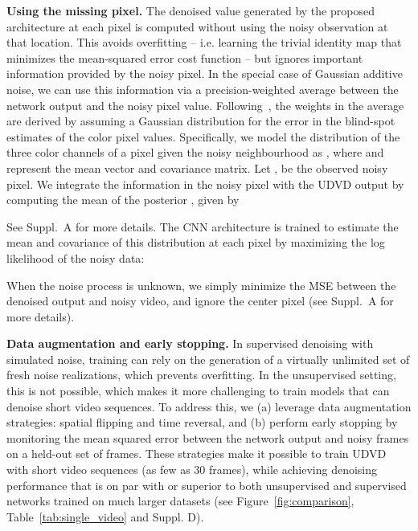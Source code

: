 \documentclass[final]{cvpr}
\begin{document}
\noindent \textbf{Using the missing pixel.} The denoised value generated by the proposed architecture at each pixel is computed without using the noisy observation at that location. This avoids overfitting -- i.e. learning the trivial identity map that minimizes the mean-squared error cost function -- but ignores important information provided by the noisy pixel. In the special case of Gaussian additive noise, we can use this information via a precision-weighted average between the network output and the noisy pixel value. Following~\cite{blindspotnet, pn2v}, the weights in the average are derived by assuming a Gaussian distribution for the error in the blind-spot estimates of the color pixel values. Specifically, we model the distribution of the three color channels of a pixel  given the noisy neighbourhood  as , where  and  represent the mean vector and covariance matrix. Let ,  be the observed noisy pixel. We integrate the information in the noisy pixel with the UDVD output by computing the mean of the posterior , given by 

See Suppl.~A for more details. 
The CNN architecture is trained to estimate the mean and covariance of this distribution at each pixel by maximizing the log likelihood of the noisy data:

When the noise process is unknown, we simply minimize the MSE between the denoised output and noisy video, and ignore the center pixel (see Suppl.~A for more details).   

\noindent \textbf{Data augmentation and early stopping.} In supervised denoising with simulated noise, training can rely on the generation of a virtually unlimited set of fresh noise realizations, which prevents overfitting. In the unsupervised setting, this is not possible, which makes it more challenging to train models that can denoise short video sequences. To address this, we (a) leverage data augmentation strategies: spatial flipping and time reversal, and (b) perform early stopping by monitoring the mean squared error between the network output and noisy frames on a held-out set of frames. These strategies make it possible to train UDVD with short video sequences (as few as 30 frames), while achieving denoising performance that is on par with or superior to both unsupervised and supervised networks trained on much larger datasets (see Figure~\ref{fig:comparison}, Table~\ref{tab:single_video} and Suppl. D). 
\end{document}
